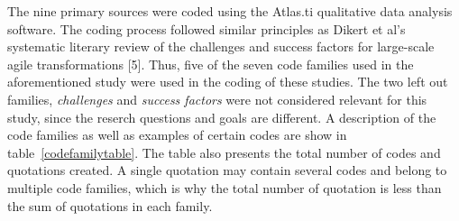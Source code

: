 The nine primary sources were coded using the Atlas.ti qualitative
data analysis software. The coding process followed similar principles
as Dikert et al's systematic literary review of the challenges and
success factors for large-scale agile transformations [5]. Thus,
five of the seven code families used in the aforementioned study
were used in the coding of these studies. The two left out families,
\textit{challenges} and \textit{success factors} were not considered
relevant for this study, since the reserch questions and goals are
different. A description of the code families as well as examples
of certain codes are show in table~\ref{codefamilytable}. The table
also presents the total number of codes and quotations created. A
single quotation may contain several codes and belong to multiple code
families, which is why the total number of quotation is less than the
sum of quotations in each family.

\bigskip

\bigskip
